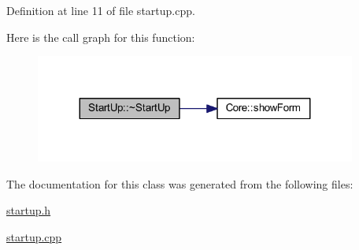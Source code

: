 Definition at line 11 of file startup.\+cpp.

Here is the call graph for this function\+:\nopagebreak
\begin{figure}[H]
\begin{center}
\leavevmode
\includegraphics[width=299pt]{class_start_up_aec41633191799fe596459a1a47fe03c3_cgraph}
\end{center}
\end{figure}


The documentation for this class was generated from the following files\+:\begin{DoxyCompactItemize}
\item 
\hyperlink{startup_8h}{startup.\+h}\item 
\hyperlink{startup_8cpp}{startup.\+cpp}\end{DoxyCompactItemize}
